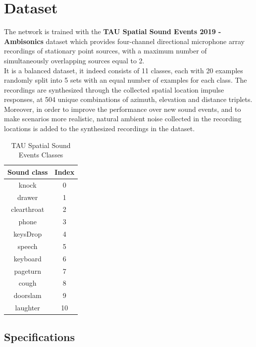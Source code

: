 \documentclass[11pt]{article}
\begin{document}
\newpage
\section{Dataset}\label{cha:data}

The network is trained with the \textbf{TAU Spatial Sound Events 2019 - Ambisonics} dataset which provides four-channel directional microphone array recordings of stationary point sources, with a maximum number of simultaneously overlapping sources equal to 2.\\
It is a balanced dataset, it indeed consists of 11 classes, each with 20 examples randomly split into 5 sets with an equal number of examples for each class. The recordings are synthesized through the collected spatial location impulse responses, at 504 unique combinations of azimuth, elevation and distance triplets.\\
Moreover, in order to improve the performance over new sound events, and to make scenarios more realistic, natural ambient noise collected in the recording locations is added to the synthesized recordings in the dataset.
\newline
\begin{table}[ht]
	\caption{TAU Spatial Sound Events Classes}
	\centering
	\begin{tabular}{c c}
		\hline\hline
		Sound class & Index \\ [0.5ex]
		\hline
		knock & 0 \\
		drawer & 1 \\
		clearthroat & 2 \\
		phone & 3 \\
		keysDrop & 4 \\
		speech & 5 \\
		keyboard & 6 \\
		pageturn & 7 \\
		cough & 8 \\
		doorslam & 9 \\
		laughter & 10\\
		\hline		
	\end{tabular}
	\label{table:classes}
\end{table}

\subsection{Specifications}
\end{document}
